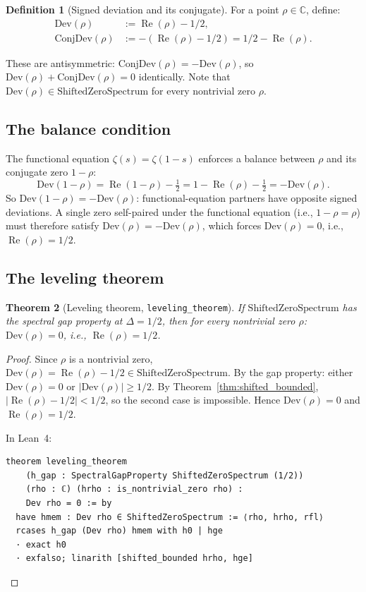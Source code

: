 \documentclass[12pt, a4paper]{article}
\theoremstyle{plain}
\newtheorem{theorem}{Theorem}[section]
\theoremstyle{definition}
\newtheorem{definition}[theorem]{Definition}
\newcommand{\C}{\mathbb{C}}
\newcommand{\re}{\operatorname{Re}}
\newcommand{\lean}[1]{\texttt{#1}}
\begin{document}
\begin{definition}[Signed deviation and its conjugate]
For a point $\rho \in \C$, define:
\begin{align*}
  \mathrm{Dev}(\rho)      &:= \re(\rho) - 1/2, \\
  \mathrm{ConjDev}(\rho)  &:= -(\re(\rho) - 1/2) = 1/2 - \re(\rho).
\end{align*}
\end{definition}

These are antisymmetric: $\mathrm{ConjDev}(\rho) = -\mathrm{Dev}(\rho)$,
so $\mathrm{Dev}(\rho) + \mathrm{ConjDev}(\rho) = 0$ identically.
Note that $\mathrm{Dev}(\rho) \in \mathrm{ShiftedZeroSpectrum}$ for every
nontrivial zero $\rho$.

\subsection{The balance condition}

The functional equation $\zeta(s) = \zeta(1-s)$ enforces a balance
between $\rho$ and its conjugate zero $1 - \rho$:
\[
  \mathrm{Dev}(1 - \rho)
  = \re(1 - \rho) - \tfrac{1}{2}
  = 1 - \re(\rho) - \tfrac{1}{2}
  = -\mathrm{Dev}(\rho).
\]
So $\mathrm{Dev}(1-\rho) = -\mathrm{Dev}(\rho)$: functional-equation partners
have opposite signed deviations.
A single zero self-paired under the functional equation (i.e., $1-\rho = \rho$)
must therefore satisfy $\mathrm{Dev}(\rho) = -\mathrm{Dev}(\rho)$,
which forces $\mathrm{Dev}(\rho) = 0$, i.e., $\re(\rho) = 1/2$.

\subsection{The leveling theorem}

\begin{theorem}[Leveling theorem, \lean{leveling\_theorem}]
\label{thm:leveling}
If $\mathrm{ShiftedZeroSpectrum}$ has the spectral gap property at $\Delta = 1/2$,
then for every nontrivial zero $\rho$: $\mathrm{Dev}(\rho) = 0$,
i.e., $\re(\rho) = 1/2$.
\end{theorem}

\begin{proof}
Since $\rho$ is a nontrivial zero, $\mathrm{Dev}(\rho) = \re(\rho) - 1/2
\in \mathrm{ShiftedZeroSpectrum}$.
By the gap property: either $\mathrm{Dev}(\rho) = 0$ or
$|\mathrm{Dev}(\rho)| \geq 1/2$.
By Theorem~\ref{thm:shifted_bounded}, $|\re(\rho) - 1/2| < 1/2$,
so the second case is impossible.
Hence $\mathrm{Dev}(\rho) = 0$ and $\re(\rho) = 1/2$.

In Lean~4:
\begin{lstlisting}[language=Lean4]
theorem leveling_theorem
    (h_gap : SpectralGapProperty ShiftedZeroSpectrum (1/2))
    (rho : ℂ) (hrho : is_nontrivial_zero rho) :
    Dev rho = 0 := by
  have hmem : Dev rho ∈ ShiftedZeroSpectrum := ⟨rho, hrho, rfl⟩
  rcases h_gap (Dev rho) hmem with h0 | hge
  · exact h0
  · exfalso; linarith [shifted_bounded hrho, hge]
\end{lstlisting}
\end{proof}
\end{document}

